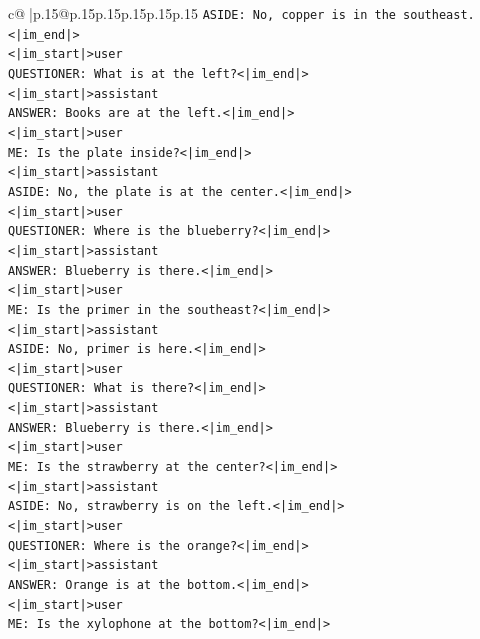 \documentclass{article}
\begin{document}
{\begin{supertabular}{c@{$\;$}|p{.15\linewidth}@{}p{.15\linewidth}p{.15\linewidth}p{.15\linewidth}p{.15\linewidth}p{.15\linewidth}}
{{{\texttt{ASIDE: No, copper is in the southeast.<|im\_end|>} \\
\texttt{<|im\_start|>user} \\
\texttt{QUESTIONER: What is at the left?<|im\_end|>} \\
\texttt{<|im\_start|>assistant} \\
\texttt{ANSWER: Books are at the left.<|im\_end|>} \\
\texttt{<|im\_start|>user} \\
\texttt{ME: Is the plate inside?<|im\_end|>} \\
\texttt{<|im\_start|>assistant} \\
\texttt{ASIDE: No, the plate is at the center.<|im\_end|>} \\
\texttt{<|im\_start|>user} \\
\texttt{QUESTIONER: Where is the blueberry?<|im\_end|>} \\
\texttt{<|im\_start|>assistant} \\
\texttt{ANSWER: Blueberry is there.<|im\_end|>} \\
\texttt{<|im\_start|>user} \\
\texttt{ME: Is the primer in the southeast?<|im\_end|>} \\
\texttt{<|im\_start|>assistant} \\
\texttt{ASIDE: No, primer is here.<|im\_end|>} \\
\texttt{<|im\_start|>user} \\
\texttt{QUESTIONER: What is there?<|im\_end|>} \\
\texttt{<|im\_start|>assistant} \\
\texttt{ANSWER: Blueberry is there.<|im\_end|>} \\
\texttt{<|im\_start|>user} \\
\texttt{ME: Is the strawberry at the center?<|im\_end|>} \\
\texttt{<|im\_start|>assistant} \\
\texttt{ASIDE: No, strawberry is on the left.<|im\_end|>} \\
\texttt{<|im\_start|>user} \\
\texttt{QUESTIONER: Where is the orange?<|im\_end|>} \\
\texttt{<|im\_start|>assistant} \\
\texttt{ANSWER: Orange is at the bottom.<|im\_end|>} \\
\texttt{<|im\_start|>user} \\
\texttt{ME: Is the xylophone at the bottom?<|im\_end|>} \\
}}}
\end{supertabular}}
\end{document}
